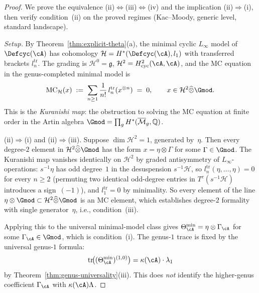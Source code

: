 \begin{proof}
We prove the equivalence
(ii)$\Leftrightarrow$(iii)$\Leftrightarrow$(iv) and the
implication (ii)$\Rightarrow$(i),
then verify condition~(ii) on the proved regimes
(Kac--Moody, generic level, standard landscape).

\smallskip\noindent
\emph{Setup.}
By Theorem~\ref{thm:explicit-theta}(a), the minimal cyclic
$L_\infty$ model of $\Defcyc(\cA)$ has cohomology
$\mathcal{H} = H^*(\Defcyc(\cA), l_1)$ with transferred
brackets $l_n^{\mathrm{tr}}$.  The grading is
$\mathcal{H}^0 = \mathfrak{g}$,
$\mathcal{H}^2 = H^2_{\mathrm{cyc}}(\cA,\cA)$,
and the MC equation in the genus-completed minimal model is
\begin{equation}\label{eq:mc-kuranishi}
\mathrm{MC}_{\mathcal{H}}(x) \;:=\;
\sum_{n \geq 1} \frac{1}{n!}\,
l_n^{\mathrm{tr}}(x^{\otimes n}) \;=\; 0,
\qquad x \in \mathcal{H}^2\widehat{\otimes}\Gmod.
\end{equation}
This is the \emph{Kuranishi map}: the obstruction to solving the
MC equation at finite order in the Artin algebra
$\Gmod = \prod_g H^*(\overline{\mathcal{M}}_g, \mathbb{Q})$.

\smallskip\noindent
\textup{(ii)}$\Rightarrow$\textup{(i)} and
\textup{(ii)}$\Rightarrow$\textup{(iii)}.
Suppose $\dim \mathcal{H}^2 = 1$, generated by~$\eta$.
Then every degree-$2$ element in
$\mathcal{H}^2\widehat{\otimes}\Gmod$ has the form
$x = \eta \otimes \Gamma$ for some $\Gamma \in \Gmod$.
The Kuranishi map vanishes identically on $\mathcal{H}^2$
by graded antisymmetry of $L_\infty$-operations:
$s^{-1}\eta$ has odd degree~$1$ in the desuspension
$s^{-1}\mathcal{H}$, so
$l_n^{\mathrm{tr}}(\eta,\ldots,\eta) = 0$ for every
$n \geq 2$ (permuting two identical odd-degree entries
in $T^c(s^{-1}\mathcal{H})$ introduces a sign~$(-1)$),
and $l_1^{\mathrm{tr}} = 0$ by minimality.
So every element of the line
$\eta \otimes \Gmod \subset \mathcal{H}^2\widehat{\otimes}\Gmod$
is an MC element, which establishes degree-$2$ formality with
single generator~$\eta$, i.e., condition~(iii).

Applying this to the universal minimal-model class gives
$\Theta_{\cA}^{\min} = \eta \otimes \Gamma_{\cA}$ for some
$\Gamma_{\cA} \in \Gmod$, which is condition~(i).
The genus-$1$ trace is fixed by the universal genus-$1$ formula:
\[
\operatorname{tr}\!\bigl((\Theta_{\cA}^{\min})^{(1,0)}\bigr)
  = \kappa(\cA)\cdot\lambda_1
\]
by Theorem~\ref{thm:genus-universality}\textup{(iii)}.
This does \emph{not} identify the higher-genus coefficient
$\Gamma_{\cA}$ with $\kappa(\cA)\Lambda$.


\end{proof}
